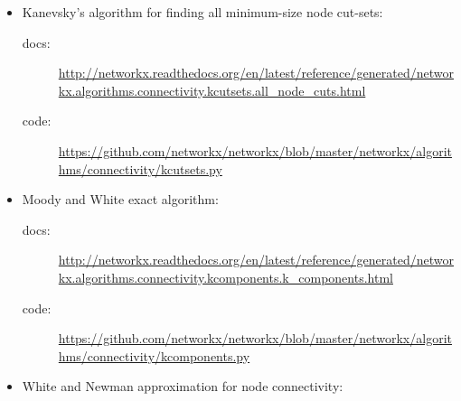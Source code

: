 \begin{itemize}

\item Kanevsky’s algorithm for finding all minimum-size node cut-sets:

\begin{scriptsize}

\begin{description}

\item[docs:] \href{http://networkx.readthedocs.org/en/latest/reference/generated/networkx.algorithms.connectivity.kcutsets.all_node_cuts.html}{http://networkx.readthedocs.org/en/latest/reference/generated/networkx.algorithms.connectivity.kcutsets.all\_node\_cuts.html}

\item[code:] \href{https://github.com/networkx/networkx/blob/master/networkx/algorithms/connectivity/kcutsets.py}{https://github.com/networkx/networkx/blob/master/networkx/algorithms/connectivity/kcutsets.py}

\end{description}

\end{scriptsize}

\item Moody and White exact algorithm:

\begin{scriptsize}

\begin{description}

\item[docs:] \href{http://networkx.readthedocs.org/en/latest/reference/generated/networkx.algorithms.connectivity.kcomponents.k_components.html}{http://networkx.readthedocs.org/en/latest/reference/generated/networkx.algorithms.connectivity.kcomponents.k\_components.html}

\item[code:] \href{https://github.com/networkx/networkx/blob/master/networkx/algorithms/connectivity/kcomponents.py}{https://github.com/networkx/networkx/blob/master/networkx/algorithms/connectivity/kcomponents.py}

\end{description}
\end{scriptsize}

\item White and Newman approximation for node connectivity:

\begin{scriptsize}
\begin{description}


\end{description}
\end{scriptsize}
\end{itemize}
